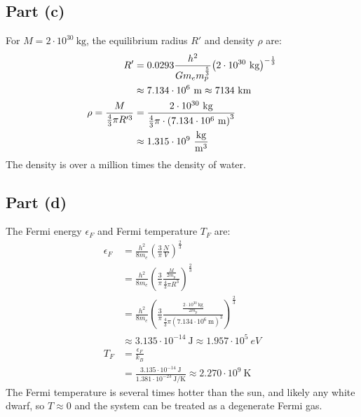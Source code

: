 \documentclass{article}
\begin{document}
\subsection*{Part (c)}
For $M = 2 \cdot 10^{30}~\unit{\kilo\gram}$, the equilibrium radius $R'$ and density $\rho$ are:
\begin{equation}
    \begin{split}
        R' & = 0.0293\frac{h^2}{Gm_em_p^{\frac{5}{3}}}{\left(2 \cdot 10^{30}~\unit{\kilo\gram}\right)}^{-\frac{1}{3}} \\
        & \approx 7.134 \cdot 10^{6}~\unit{\meter} \approx 7134~\unit{\kilo\meter} \\
        \rho = \frac{M}{\frac{4}{3}\pi R'^3} & = \frac{2 \cdot 10^{30}~\unit{\kilo\gram}}{\frac{4}{3}\pi \cdot {\left(7.134 \cdot 10^{6}~\unit{\meter}\right)}^3} \\
        & \approx 1.315 \cdot 10^9~\unit{\frac{\kilo\gram}{\meter\cubed}}
    \end{split}
\end{equation}
The density is over a million times the density of water.
\subsection*{Part (d)}
The Fermi energy $\epsilon_F$ and Fermi temperature $T_F$ are:
\begin{equation}
    \begin{split}
        \epsilon_F & = \frac{h^2}{8m_e}{\left(\frac{3}{\pi}\frac{N}{V}\right)}^{\frac{2}{3}} \\
        & = \frac{h^2}{8m_e}{\left(\frac{3}{\pi}\frac{\frac{M}{2m_p}}{\frac{4}{3}\pi R^3}\right)}^{\frac{2}{3}} \\
        & = \frac{h^2}{8m_e}{\left(\frac{3}{\pi}\frac{\frac{2 \cdot 10^{30}~\unit{\kilo\gram}}{2m_p}}{\frac{4}{3}\pi {\left(7.134 \cdot 10^6~\unit{\meter}\right)}^3}\right)}^{\frac{2}{3}} \\
        & \approx 3.135 \cdot 10^{-14}~\unit{\joule} \approx 1.957 \cdot 10^5 ~\unit{eV} \\
        T_F & = \frac{\epsilon_F}{k_B} \\
        & = \frac{3.135 \cdot 10^{-14}~\unit{\joule}}{1.381 \cdot 10^{-23}~\unit{\joule\per\kelvin}} \approx 2.270 \cdot 10^9~\unit{\kelvin}
    \end{split}
\end{equation}
The Fermi temperature is several times hotter than the sun, and likely any white dwarf, so $T \approx 0$ and the system can be treated as a degenerate Fermi gas.
\end{document}
